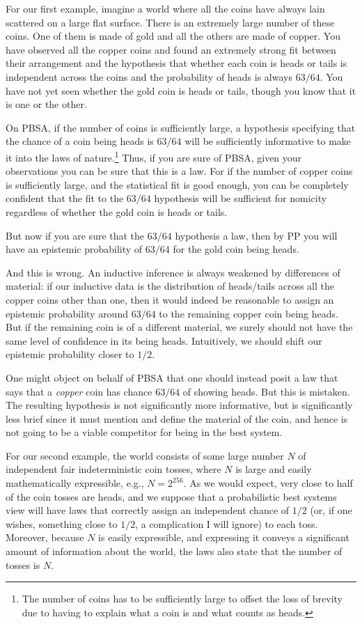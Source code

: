 For our first example, imagine a world where all the coins have always lain scattered on a large flat surface. There is an 
extremely large number of these coins. One of them is made of gold and all the others are made of copper. You have observed
all the copper coins and found an extremely strong fit between their arrangement and the hypothesis that whether each coin 
is heads or tails is independent across the coins and the probability of heads is always $63/64$. You have not yet seen whether
the gold coin is heads or tails, though you know that it is one or the other.

On PBSA, if the number of coins is sufficiently large, a hypothesis specifying that the chance of a coin being heads is $63/64$ will 
be sufficiently informative to make it into the laws of nature.\footnote{The number of coins has to be sufficiently large to 
offset the loss of brevity due to having to explain what a coin is and what counts as heads.} Thus, if you are sure of PBSA,
given your observations you can be sure that this is a law. For if the number of copper coins is sufficiently large, and the
statistical fit is good enough, you can be completely confident that the fit to the $63/64$ hypothesis will be sufficient for nomicity regardless of whether the gold coin is heads or tails. 

But now if you are sure that the $63/64$ hypothesis a law, then by PP you will have an epistemic probability of $63/64$ for the gold coin being heads. 

And this is wrong. An inductive inference is always weakened by differences of material: if our inductive data is the distribution
of heads/tails across all the copper coins other than one, then it would indeed be reasonable to assign an epistemic probability
around $63/64$ to the remaining copper coin being heads. But if the remaining coin is of a different material, we surely should 
not have the same level of confidence in its being heads. Intuitively, we should shift our epistemic probability closer to $1/2$.

One might object on behalf of PBSA that one should instead posit a law that says that a \textit{copper} coin has chance 
$63/64$ of showing heads. But this is mistaken. The resulting hypothesis is not significantly more informative, but is significantly
less brief since it must mention and define the material of the coin, and hence is not going to be a viable competitor for being 
in the best system.

For our second example, the world consists of some large number $N$ of independent fair indeterministic coin tosses, where $N$ is large
and easily mathematically expressible, e.g., $N=2^{256}$. As we would expect, very close to half of the coin tosses are heads, and 
we suppose that a probabilistic best systems view will have laws that correctly assign an independent chance of $1/2$ (or, if 
one wishes,  something close to $1/2$, a complication I will ignore) to each toss. Moreover, because $N$ is easily expressible,
and expressing it conveys a significant amount of information about the world, the laws also state that the number of tosses is
$N$. 

